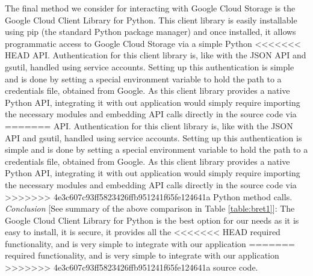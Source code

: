 \documentclass[10pt, onecolumn, draftclsnofoot, letterpaper, compsoc]{IEEEtran}
\begin{document}
The final method we consider for interacting with Google Cloud Storage is the
Google Cloud Client Library for Python. This client library is easily
installable using pip (the standard Python package manager) and once installed,
it allows programmatic access to Google Cloud Storage via a simple Python
<<<<<<< HEAD
API\cite{cloudStorageLib}. Authentication for this client library is, like with
the JSON API and gsutil, handled using service accounts\cite{cloudStorageLib}.
Setting up this authentication is simple and is done by setting a special
environment variable to hold the path to a credentials file, obtained from
Google\cite{cloudStorageLib}. As this client library provides a native Python
API, integrating it with out application would simply require importing the
necessary modules and embedding API calls directly in the source code via
=======
API\cite{cloudStorageLib}. Authentication for this client library is, like with
the JSON API and gsutil, handled using service accounts\cite{cloudStorageLib}.
Setting up this authentication is simple and is done by setting a special
environment variable to hold the path to a credentials file, obtained from
Google\cite{cloudStorageLib}. As this client library provides a native Python
API, integrating it with out application would simply require importing the
necessary modules and embedding API calls directly in the source code via
>>>>>>> 4e3c607c93ff5823426ffb951241f65fe124641a
Python method calls\cite{cloudStorageLib}. \\

\textit{Conclusion} [See summary of the above comparison in Table \ref{table:bret1}]:
The Google Cloud Client Library for Python is the best
option for our needs as it is easy to install, it is secure, it provides all the
<<<<<<< HEAD
required functionality, and is very simple to integrate with our application
=======
required functionality, and is very simple to integrate with our application
>>>>>>> 4e3c607c93ff5823426ffb951241f65fe124641a
source code. \\
\end{document}
